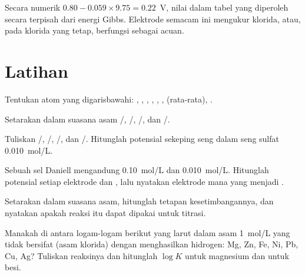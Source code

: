 Secara numerik $0.80 - 0.059 \times 9.75 = 0.22$~V, nilai dalam tabel
yang diperoleh secara terpisah dari energi Gibbs. Elektrode semacam ini
mengukur klorida, atau, pada klorida yang tetap, berfungsi sebagai acuan.

\section{Latihan}

\begin{exercise}[$\star$]\label{exo:b1:nernst:1}
Tentukan  atom yang digarisbawahi: ,
, , ,
, , 
(rata-rata), .
\end{exercise}

\begin{exercise}[$\star$]\label{exo:b1:nernst:2}
Setarakan dalam suasana asam  /,
/, /, dan /.
\end{exercise}

\begin{exercise}[$\star$]\label{exo:b1:nernst:3}
Tuliskan  /, /,
/, dan /. Hitunglah potensial sekeping
seng dalam seng sulfat \qty{0.010}{mol/L}.
\end{exercise}

\begin{exercise}[$\star$]\label{exo:b1:nernst:4}
Sebuah sel Daniell mengandung  \qty{0.10}{mol/L} dan 
\qty{0.010}{mol/L}. Hitunglah potensial setiap elektrode dan , lalu nyatakan elektrode mana yang menjadi .
\end{exercise}

\begin{exercise}[$\star\star$]\label{exo:b1:nernst:5}
Setarakan  dalam suasana asam, hitunglah tetapan
kesetimbangannya, dan nyatakan apakah reaksi itu dapat dipakai untuk
titrasi.
\end{exercise}

\begin{exercise}[$\star\star$]\label{exo:b1:nernst:6}
Manakah di antara logam-logam berikut yang larut dalam asam
\qty{1}{mol/L} yang tidak bersifat  (asam klorida) dengan
menghasilkan hidrogen: Mg, Zn, Fe, Ni, Pb, Cu, Ag? Tuliskan reaksinya dan
hitunglah $\log K$ untuk magnesium dan untuk besi.
\end{exercise}


